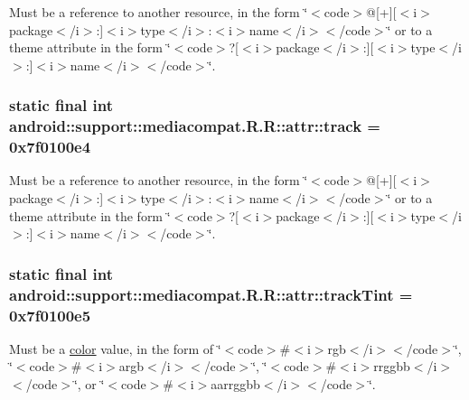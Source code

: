 Must be a reference to another resource, in the form \char`\"{}$<$code$>$@\mbox{[}+\mbox{]}\mbox{[}$<$i$>$package$<$/i$>$:\mbox{]}$<$i$>$type$<$/i$>$:$<$i$>$name$<$/i$>$$<$/code$>$\char`\"{} or to a theme attribute in the form \char`\"{}$<$code$>$?\mbox{[}$<$i$>$package$<$/i$>$:\mbox{]}\mbox{[}$<$i$>$type$<$/i$>$:\mbox{]}$<$i$>$name$<$/i$>$$<$/code$>$\char`\"{}. \hypertarget{classandroid_1_1support_1_1mediacompat_1_1_r_1_1attr_d5bf55f6c441a88b23a001967186d0a9}{
\subsubsection[{track}]{\setlength{\rightskip}{0pt plus 5cm}static final int android::support::mediacompat.R.R::attr::track = 0x7f0100e4}}
\label{classandroid_1_1support_1_1mediacompat_1_1_r_1_1attr_d5bf55f6c441a88b23a001967186d0a9}


Must be a reference to another resource, in the form \char`\"{}$<$code$>$@\mbox{[}+\mbox{]}\mbox{[}$<$i$>$package$<$/i$>$:\mbox{]}$<$i$>$type$<$/i$>$:$<$i$>$name$<$/i$>$$<$/code$>$\char`\"{} or to a theme attribute in the form \char`\"{}$<$code$>$?\mbox{[}$<$i$>$package$<$/i$>$:\mbox{]}\mbox{[}$<$i$>$type$<$/i$>$:\mbox{]}$<$i$>$name$<$/i$>$$<$/code$>$\char`\"{}. \hypertarget{classandroid_1_1support_1_1mediacompat_1_1_r_1_1attr_a56b9144a22ba331cf3db6f6f34d838d}{
\subsubsection[{trackTint}]{\setlength{\rightskip}{0pt plus 5cm}static final int android::support::mediacompat.R.R::attr::trackTint = 0x7f0100e5}}
\label{classandroid_1_1support_1_1mediacompat_1_1_r_1_1attr_a56b9144a22ba331cf3db6f6f34d838d}


Must be a \hyperlink{classandroid_1_1support_1_1mediacompat_1_1_r_1_1color}{color} value, in the form of \char`\"{}$<$code$>$\#$<$i$>$rgb$<$/i$>$$<$/code$>$\char`\"{}, \char`\"{}$<$code$>$\#$<$i$>$argb$<$/i$>$$<$/code$>$\char`\"{}, \char`\"{}$<$code$>$\#$<$i$>$rrggbb$<$/i$>$$<$/code$>$\char`\"{}, or \char`\"{}$<$code$>$\#$<$i$>$aarrggbb$<$/i$>$$<$/code$>$\char`\"{}. 


